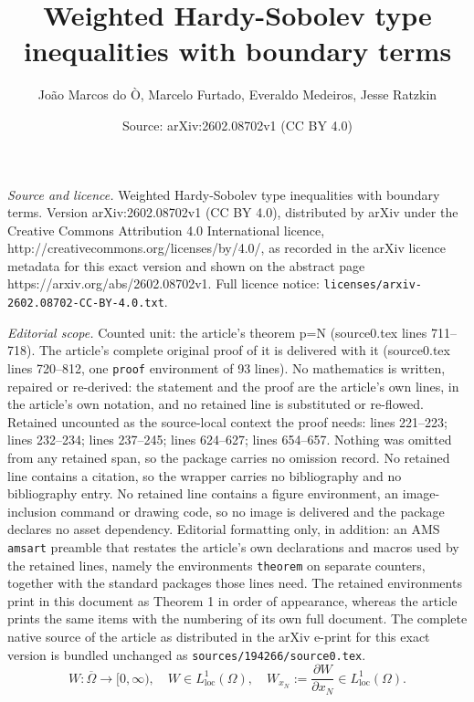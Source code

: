 \documentclass[10pt,a4paper]{amsart}
\title{Weighted Hardy-Sobolev type inequalities with boundary terms}
\author{Jo\~ao Marcos do \`O, Marcelo Furtado, Everaldo Medeiros, Jesse Ratzkin}
\date{Source: arXiv:2602.08702v1 (CC BY 4.0)}
\begin{document}
\maketitle

\noindent\emph{Source and licence.} Weighted Hardy-Sobolev type inequalities with boundary terms. Version arXiv:2602.08702v1 (CC BY 4.0), distributed by arXiv under the Creative Commons Attribution 4.0 International licence, http://creativecommons.org/licenses/by/4.0/, as recorded in the arXiv licence metadata for this exact version and shown on the abstract page https://arxiv.org/abs/2602.08702v1. Full licence notice: \texttt{licenses/arxiv-2602.08702-CC-BY-4.0.txt}.\par\smallskip

\noindent\textit{Editorial scope.} Counted unit: the article's theorem p=N (source0.tex lines 711--718). The article's complete original proof of it is delivered with it (source0.tex lines 720--812, one \texttt{proof} environment of 93 lines). No mathematics is written, repaired or re-derived: the statement and the proof are the article's own lines, in the article's own notation, and no retained line is substituted or re-flowed.  Retained uncounted as the source-local context the proof needs: lines 221--223; lines 232--234; lines 237--245; lines 624--627; lines 654--657.  Nothing was omitted from any retained span, so the package carries no omission record.  No retained line contains a citation, so the wrapper carries no bibliography and no bibliography entry.  No retained line contains a figure environment, an image-inclusion command or drawing code, so no image is delivered and the package declares no asset dependency.  Editorial formatting only, in addition: an AMS \texttt{amsart} preamble that restates the article's own declarations and macros used by the retained lines, namely the environments \texttt{theorem} on separate counters, together with the standard packages those lines need.  The retained environments print in this document as Theorem 1 in order of appearance, whereas the article prints the same items with the numbering of its own full document.  The complete native source of the article as distributed in the arXiv e-print for this exact version is bundled unchanged as \texttt{sources/194266/source0.tex}.
\begin{equation} \label{W_0} \tag{$W_0$} W:\overline{\Omega} \rightarrow [0,\infty), 
\quad W \in L^1_{\mathrm{loc}}(\Omega),\quad W_{x_N} := \frac{\partial W}{\partial x_N}  
\in L^1_{\mathrm{loc}}(\Omega). \end{equation}
\end{document}
